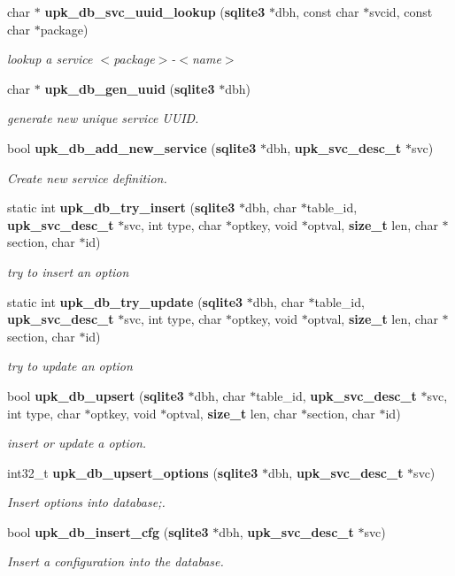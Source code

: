 \begin{DoxyCompactItemize}
char $\ast$ {\bf upk\_\-db\_\-svc\_\-uuid\_\-lookup} ({\bf sqlite3} $\ast$dbh, const char $\ast$svcid, const char $\ast$package)
\begin{DoxyCompactList}\small\item\em lookup a service $<$package$>$-\/$<$name$>$ \end{DoxyCompactList}\item 
char $\ast$ {\bf upk\_\-db\_\-gen\_\-uuid} ({\bf sqlite3} $\ast$dbh)
\begin{DoxyCompactList}\small\item\em generate new unique service UUID. \end{DoxyCompactList}\item 
bool {\bf upk\_\-db\_\-add\_\-new\_\-service} ({\bf sqlite3} $\ast$dbh, {\bf upk\_\-svc\_\-desc\_\-t} $\ast$svc)
\begin{DoxyCompactList}\small\item\em Create new service definition. \end{DoxyCompactList}\item 
static int {\bf upk\_\-db\_\-try\_\-insert} ({\bf sqlite3} $\ast$dbh, char $\ast$table\_\-id, {\bf upk\_\-svc\_\-desc\_\-t} $\ast$svc, int type, char $\ast$optkey, void $\ast$optval, {\bf size\_\-t} len, char $\ast$section, char $\ast$id)
\begin{DoxyCompactList}\small\item\em try to insert an option \end{DoxyCompactList}\item 
static int {\bf upk\_\-db\_\-try\_\-update} ({\bf sqlite3} $\ast$dbh, char $\ast$table\_\-id, {\bf upk\_\-svc\_\-desc\_\-t} $\ast$svc, int type, char $\ast$optkey, void $\ast$optval, {\bf size\_\-t} len, char $\ast$section, char $\ast$id)
\begin{DoxyCompactList}\small\item\em try to update an option \end{DoxyCompactList}\item 
bool {\bf upk\_\-db\_\-upsert} ({\bf sqlite3} $\ast$dbh, char $\ast$table\_\-id, {\bf upk\_\-svc\_\-desc\_\-t} $\ast$svc, int type, char $\ast$optkey, void $\ast$optval, {\bf size\_\-t} len, char $\ast$section, char $\ast$id)
\begin{DoxyCompactList}\small\item\em insert or update a option. \end{DoxyCompactList}\item 
int32\_\-t {\bf upk\_\-db\_\-upsert\_\-options} ({\bf sqlite3} $\ast$dbh, {\bf upk\_\-svc\_\-desc\_\-t} $\ast$svc)
\begin{DoxyCompactList}\small\item\em Insert options into database;. \end{DoxyCompactList}\item 
bool {\bf upk\_\-db\_\-insert\_\-cfg} ({\bf sqlite3} $\ast$dbh, {\bf upk\_\-svc\_\-desc\_\-t} $\ast$svc)
\begin{DoxyCompactList}\small\item\em Insert a configuration into the database. \end{DoxyCompactList}\end{DoxyCompactItemize}
